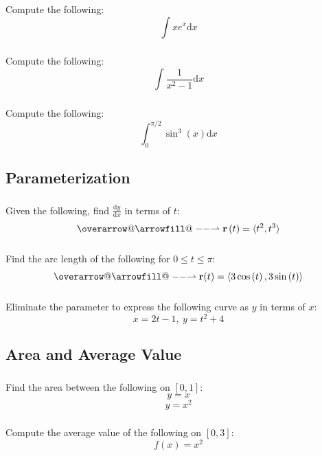 \documentclass[12pt]{article}
\makeatletter
\newcommand*{\overrightharpoonup}{\mathpalette{\overarrow@\rightharpoonupfill@}}
\newcommand*{\rightharpoonupfill@}{\arrowfill@\relbar\relbar\rightharpoonup}
\renewcommand{\vec}[1]{\overrightharpoonup{\bm{\mathrm{#1}}}}
\newcommand{\dd}{\text{d}}
\makeatother
\begin{document}
			\subsubsection{}
				Compute the following:
				\[\int{xe^{x}\dd x}\]
			\subsubsection{}
				Compute the following:
				\[\int{\frac{1}{x^2-1}\dd x}\]
			\subsubsection{}
				Compute the following:
				\[\int_0^{\pi/2}{\sin^3\left(x\right)\dd x}\]

		\subsection{Parameterization}
			\subsubsection{}
				Given the following, find \(\frac{\dd y}{\dd x}\) in terms of \(t\):
				\[\vec{r}\left(t\right)=\langle t^2,t^3\rangle\]
			\subsubsection{}
				Find the arc length of the following for \(0\le t\le\pi\):
				\[\vec{r}(t)=\langle3\cos\left(t\right),3\sin\left(t\right)\rangle\]
			\subsubsection{}
				Eliminate the parameter to express the following curve as \(y\) in terms of \(x\):
				\[x=2t-1,\>y=t^2+4\]

		\subsection{Area and Average Value}
			\subsubsection{}
				Find the area between the following on \([0,1]\):
				\[y=x\]
				\[y=x^2\]
			\subsubsection{}
				Compute the average value of the following on \([0,3]\):
				\[f(x)=x^2\]
\end{document}
